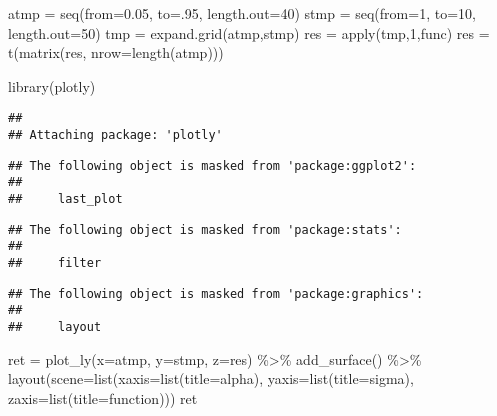 \documentclass[
]{article}
\newenvironment{Shaded}{\begin{snugshade}}{\end{snugshade}}
\newcommand{\AttributeTok}[1]{\textcolor[rgb]{0.77,0.63,0.00}{#1}}
\newcommand{\DecValTok}[1]{\textcolor[rgb]{0.00,0.00,0.81}{#1}}
\newcommand{\FloatTok}[1]{\textcolor[rgb]{0.00,0.00,0.81}{#1}}
\newcommand{\FunctionTok}[1]{\textcolor[rgb]{0.00,0.00,0.00}{#1}}
\newcommand{\NormalTok}[1]{#1}
\newcommand{\OtherTok}[1]{\textcolor[rgb]{0.56,0.35,0.01}{#1}}
\newcommand{\SpecialCharTok}[1]{\textcolor[rgb]{0.00,0.00,0.00}{#1}}
\newcommand{\StringTok}[1]{\textcolor[rgb]{0.31,0.60,0.02}{#1}}
\begin{document}
\begin{Shaded}
\begin{Highlighting}[]
\NormalTok{atmp }\OtherTok{=} \FunctionTok{seq}\NormalTok{(}\AttributeTok{from=}\FloatTok{0.05}\NormalTok{, }\AttributeTok{to=}\NormalTok{.}\DecValTok{95}\NormalTok{, }\AttributeTok{length.out=}\DecValTok{40}\NormalTok{)}
\NormalTok{stmp }\OtherTok{=} \FunctionTok{seq}\NormalTok{(}\AttributeTok{from=}\DecValTok{1}\NormalTok{, }\AttributeTok{to=}\DecValTok{10}\NormalTok{, }\AttributeTok{length.out=}\DecValTok{50}\NormalTok{)}
\NormalTok{tmp }\OtherTok{=} \FunctionTok{expand.grid}\NormalTok{(atmp,stmp)}
\NormalTok{res }\OtherTok{=} \FunctionTok{apply}\NormalTok{(tmp,}\DecValTok{1}\NormalTok{,func)}
\NormalTok{res }\OtherTok{=} \FunctionTok{t}\NormalTok{(}\FunctionTok{matrix}\NormalTok{(res, }\AttributeTok{nrow=}\FunctionTok{length}\NormalTok{(atmp)))}

\FunctionTok{library}\NormalTok{(plotly)}
\end{Highlighting}
\end{Shaded}

\begin{verbatim}
## 
## Attaching package: 'plotly'
\end{verbatim}

\begin{verbatim}
## The following object is masked from 'package:ggplot2':
## 
##     last_plot
\end{verbatim}

\begin{verbatim}
## The following object is masked from 'package:stats':
## 
##     filter
\end{verbatim}

\begin{verbatim}
## The following object is masked from 'package:graphics':
## 
##     layout
\end{verbatim}

\begin{Shaded}
\begin{Highlighting}[]
\NormalTok{ret }\OtherTok{=} \FunctionTok{plot\_ly}\NormalTok{(}\AttributeTok{x=}\NormalTok{atmp, }\AttributeTok{y=}\NormalTok{stmp, }\AttributeTok{z=}\NormalTok{res) }\SpecialCharTok{\%\textgreater{}\%} \FunctionTok{add\_surface}\NormalTok{() }\SpecialCharTok{\%\textgreater{}\%}
  \FunctionTok{layout}\NormalTok{(}\AttributeTok{scene=}\FunctionTok{list}\NormalTok{(}\AttributeTok{xaxis=}\FunctionTok{list}\NormalTok{(}\AttributeTok{title=}\StringTok{\textquotesingle{}alpha\textquotesingle{}}\NormalTok{), }\AttributeTok{yaxis=}\FunctionTok{list}\NormalTok{(}\AttributeTok{title=}\StringTok{\textquotesingle{}sigma\textquotesingle{}}\NormalTok{), }\AttributeTok{zaxis=}\FunctionTok{list}\NormalTok{(}\AttributeTok{title=}\StringTok{\textquotesingle{}function\textquotesingle{}}\NormalTok{)))}
\NormalTok{ret}
\end{Highlighting}
\end{Shaded}
\end{document}
